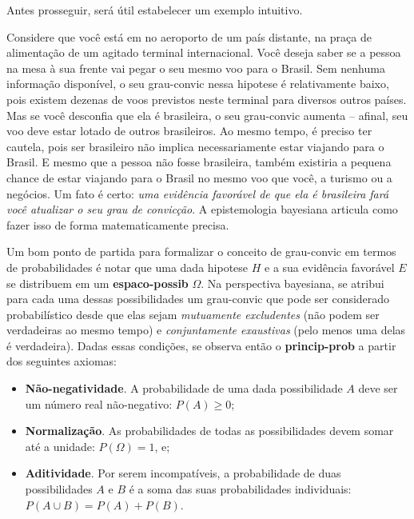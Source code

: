 \documentclass[./main.tex]{subfiles}
\begin{document}
\par Antes prosseguir, será útil estabelecer um exemplo intuitivo. 

\par Considere que você está em no aeroporto de um país distante, na praça de alimentação de um agitado terminal internacional. Você deseja saber se a pessoa na mesa à sua frente vai pegar o seu mesmo voo para o Brasil. Sem nenhuma informação disponível, o seu \gls{grau-convic} nessa \gls{hipotese} é relativamente baixo, pois existem dezenas de voos previstos neste terminal para diversos outros países. Mas se você desconfia que ela é brasileira, o seu \gls{grau-convic} aumenta – afinal, seu voo deve estar lotado de outros brasileiros. Ao mesmo tempo, é preciso ter cautela, pois ser brasileiro não implica necessariamente estar viajando para o Brasil. E mesmo que a pessoa não fosse brasileira, também existiria a pequena chance de estar viajando para o Brasil no mesmo voo que você, a turismo ou a negócios. Um fato é certo: \textit{uma evidência favorável de que ela é brasileira fará você atualizar o seu grau de convicção}. A epistemologia bayesiana articula como fazer isso de forma matematicamente precisa.

\par Um bom ponto de partida para formalizar o conceito de \gls{grau-convic} em termos de probabilidades é notar que uma dada \gls{hipotese} $H$ e a sua evidência favorável $E$ se distribuem em um \textbf{\gls{espaco-possib}} $\Omega$. Na perspectiva bayesiana, se atribui para cada uma dessas possibilidades um \gls{grau-convic} que pode ser considerado probabilístico desde que elas sejam \textit{mutuamente excludentes} (não podem ser verdadeiras ao mesmo tempo) e \textit{conjuntamente exaustivas} (pelo menos uma delas é verdadeira). Dadas essas condições, se observa então o \textbf{\gls{princip-prob}} a partir dos seguintes axiomas:
\begin{itemize}
    \item \textbf{Não-negatividade}. A probabilidade de uma dada possibilidade $A$ deve ser um número real não-negativo: $P(A) \geq 0$;
    \item \textbf{Normalização}. As probabilidades de todas as possibilidades devem somar até a unidade: $P(\Omega) = 1$, e;
    \item \textbf{Aditividade}. Por serem incompatíveis, a probabilidade de duas possibilidades $A$ e $B$ é a soma das suas probabilidades individuais: $P(A \cup B ) = P(A) + P(B)$.
\end{itemize}
\end{document}
